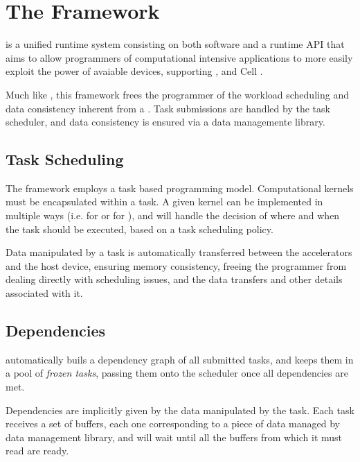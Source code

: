 \documentclass[main.tex]{subfiles}
\begin{document}
\chapter{The \starpu Framework} \label{section:starpu}



\starpu \cite{augonnet2011starpu} is a unified runtime system consisting on both software and a runtime API that aims to allow programmers of computational intensive applications to more easily exploit the power of avaiable devices, supporting \cpus, \gpus and Cell .

Much like \gama, this framework frees the programmer of the workload scheduling and data consistency inherent from a \hetplat. Task submissions are handled by the \starpu task scheduler, and data consistency is ensured via a data managemente library.

\section{Task Scheduling}

The framework employs a task based programming model. Computational kernels must be encapsulated within a task. A given kernel can be implemented in multiple ways (i.e. for \cpus or for \cuda), and \starpu will handle the decision of where and when the task should be executed, based on a task scheduling policy.

Data manipulated by a task is automatically transferred between the accelerators and the host device, ensuring memory consistency, freeing the programmer from dealing directly with scheduling issues, and the data transfers and other details associated with it.


\section{Dependencies}

\starpu automatically buils a dependency graph of all submitted tasks, and keeps them in a pool of \emph{frozen tasks}, passing them onto the scheduler once all dependencies are met.

Dependencies are implicitly given by the data manipulated by the task. Each task receives a set of buffers, each one corresponding to a piece of data managed by \starpu data management library, and will wait until all the buffers from which it must read are ready.
\end{document}
